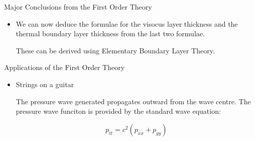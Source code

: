 \documentclass{beamer}
\begin{document}
\begin{frame} {Major Conclusions from the First Order Theory}
\begin{itemize}

\item We can now deduce the formulae for the visocus layer thickness and the thermal boundary layer thickness from the last two formulae.

These can be derived using Elementary Boundary Layer Theory.

\end{itemize}
\end{frame}

\begin{frame}{Applications of the First Order Theory}

\begin{itemize}

\item Strings on a guitar

The pressure wave generated propagates outward from the wave centre. The pressure wave funciton is provided by the standard wave equation:

\begin{equation*}
p_{tt} = c^2 (p_{xx} + p_{yy})
\end{equation*}

\end{itemize}

\end{frame}
\end{document}
